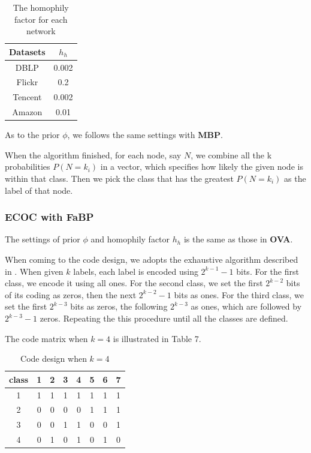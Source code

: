 \begin{table}[!ht]
\centering
\begin{tabular}{c|c}
\toprule
\textbf{Datasets} & \textbf{$h_h$}\\
\midrule
DBLP & 0.002\\
Flickr & 0.2\\
Tencent & 0.002\\
Amazon & 0.01\\
\bottomrule
\end{tabular}
\caption{The homophily factor for each network}
\end{table} 

As to the prior $\phi$, we follows the same settings with \textbf{MBP}.

When the algorithm finished, for each node, say $N$, we combine all the k probabilities $P(N=k_i)$ in a vector, which specifies how likely the given node is within that class. Then we pick the class that has the greatest $P(N=k_i)$ as the label of that node.

\subsubsection*{ECOC with \textbf{FaBP}}
The settings of prior $\phi$ and homophily factor $h_h$ is the same as those in \textbf{OVA}.

When coming to the code design, we adopts the exhaustive algorithm described in \cite{Thomas1995}. When given $k$ labels, each label is encoded using $2^{k-1}-1$ bits. For the first class, we encode it using all ones. For the second class, we set the first $2^{k-2}$ bits of its coding as zeros, then the next $2^{k-2}-1$ bits as ones. For the third class, we set the first $2^{k-3}$ bits as zeros, the following $2^{k-3}$ as ones, which are followed by $2^{k-3}-1$ zeros. Repeating the this procedure until all the classes are defined. 

The code matrix when $k=4$ is illustrated in Table 7.

\begin{table}[!ht]
\centering
\begin{tabular}{c|ccccccc}
\toprule
\textbf{class} & 1 & 2 & 3 & 4 & 5 & 6 & 7\\
\midrule
1 & 1 & 1 & 1 & 1 & 1 & 1 & 1\\
2 & 0 & 0 & 0 & 0 & 1 & 1 & 1\\
3 & 0 & 0 & 1 & 1 & 0 & 0 & 1\\
4 & 0 & 1 & 0 & 1 & 0 & 1 & 0\\
\bottomrule
\end{tabular}
\caption{Code design when $k=4$}
\end{table}

